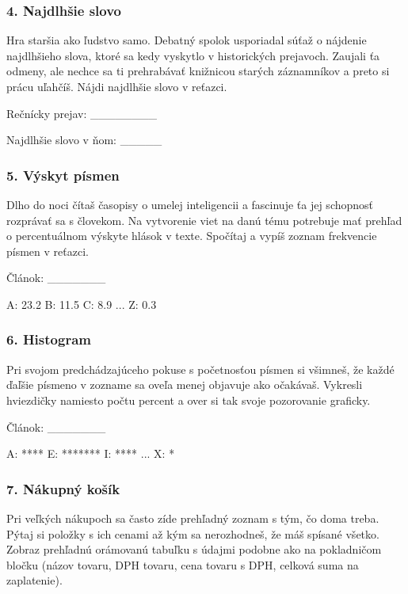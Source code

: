 \subsubsection*{4. Najdlhšie slovo}
Hra staršia ako ľudstvo samo. Debatný spolok usporiadal súťaž o nájdenie najdlhšieho slova, ktoré sa kedy vyskytlo v historických prejavoch. Zaujali ťa odmeny, ale nechce sa ti prehrabávať knižnicou starých záznamníkov a preto si prácu uľahčíš. Nájdi najdlhšie slovo v reťazci.

\begin{code}
Rečnícky prejav: ________

Najdlhšie slovo v ňom: _____
\end{code}

\subsubsection*{5. Výskyt písmen}
Dlho do noci čítaš časopisy o umelej inteligencii a fascinuje ťa jej schopnosť rozprávať sa s človekom. Na vytvorenie viet na danú tému potrebuje mať prehľad o percentuálnom výskyte hlások v texte. Spočítaj a vypíš zoznam frekvencie písmen v reťazci.

\begin{code}
Článok: _______

A: 23.2 %
B: 11.5 %
C: 8.9 %
...
Z: 0.3 %
\end{code}


\subsubsection*{6. Histogram}
Pri svojom predchádzajúceho pokuse s početnosťou písmen si všimneš, že každé ďaľšie písmeno v zozname sa oveľa menej objavuje ako očakávaš. Vykresli hviezdičky namiesto počtu percent a over si tak svoje pozorovanie graficky.

\begin{code}
Článok: _______

A: ****
E: *******
I: ****
...
X: *
\end{code}


\subsubsection*{7. Nákupný košík}
Pri veľkých nákupoch sa často zíde prehľadný zoznam s tým, čo doma treba. Pýtaj si položky s ich cenami až kým sa nerozhodneš, že máš spísané všetko. Zobraz prehľadnú orámovanú tabuľku s údajmi podobne ako na pokladničom bločku (názov tovaru, DPH tovaru, cena tovaru s DPH, celková suma na zaplatenie).

